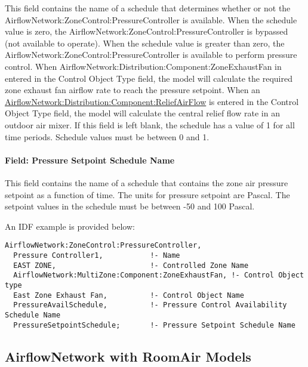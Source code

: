 This field contains the name of a schedule that determines whether or not the AirflowNetwork:ZoneControl:PressureController is available. When the schedule value is zero, the AirflowNetwork:ZoneControl:PressureController is bypassed (not available to operate). When the schedule value is greater than zero, the AirflowNetwork:ZoneControl:PressureController is available to perform pressure control. When AirflowNetwork:Distribution:Component:ZoneExhaustFan in entered in the Control Object Type field, the model will calculate the required zone exhaust fan airflow rate to reach the pressure setpoint. When an \hyperref[airflowNetworkdistributioncomponentreliefairflow]{AirflowNetwork:Distribution:Component:ReliefAirFlow} is entered in the Control Object Type field, the model will calculate the central relief flow rate in an outdoor air mixer. If this field is left blank, the schedule has a value of 1 for all time periods. Schedule values must be between 0 and 1.

\paragraph{ Field: Pressure Setpoint Schedule Name}\label{field-pressure-setpoint-schedule-name}

This field contains the name of a schedule that contains the zone air pressure setpoint as a function of time. The units for pressure setpoint are Pascal. The setpoint values in the schedule must be between -50 and 100 Pascal.

An IDF example is provided below:

\begin{lstlisting}
AirflowNetwork:ZoneControl:PressureController,
  Pressure Controller1,           !- Name
  EAST ZONE,                      !- Controlled Zone Name
  AirflowNetwork:MultiZone:Component:ZoneExhaustFan, !- Control Object type
  East Zone Exhaust Fan,          !- Control Object Name
  PressureAvailSchedule,          !- Pressure Control Availability Schedule Name
  PressureSetpointSchedule;       !- Pressure Setpoint Schedule Name
\end{lstlisting}

\subsection{AirflowNetwork with RoomAir Models}\label{airflownetwork-roomair-models}

